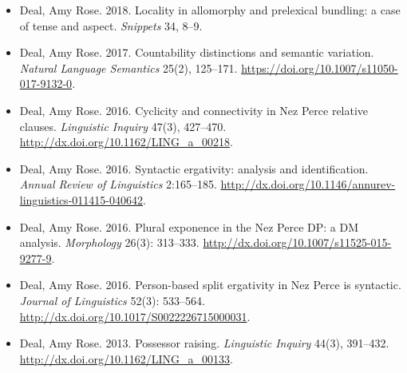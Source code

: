 \documentclass[12pt]{article}
\begin{document}
\begin{itemize}[labelsep=.5cm,leftmargin=0cm,itemindent=0cm]
    \item \new  Deal, Amy Rose. 2018. Locality in allomorphy and prelexical bundling: a case of tense and aspect. \emph{Snippets} 34, 8--9. 
    

  \item  Deal, Amy Rose. 2017. {Countability distinctions and semantic variation.}  \emph{Natural Language Semantics} 25(2), 125--171. \href{https://doi.org/10.1007/s11050-017-9132-0}{https://doi.org/10.1007/s11050-017-9132-0}.


  \item   Deal, Amy Rose. 2016. {Cyclicity and connectivity in Nez Perce relative clauses.} \emph{Linguistic Inquiry} 47(3),  427--470. \href{http://dx.doi.org/10.1162/LING_a_00218}{http://dx.doi.org/10.1162/LING\_a\_00218}.
 

  \item  Deal, Amy Rose. 2016. {Syntactic ergativity: analysis and identification.}  \emph{Annual Review of Linguistics} 2:165--185. \newline \href{http://dx.doi.org/10.1146/annurev-linguistics-011415-040642}{http://dx.doi.org/10.1146/annurev-linguistics-011415-040642}.
 
  \item  Deal, Amy Rose. 2016. {Plural exponence in the Nez Perce DP: a DM analysis.} \emph{Morphology} 26(3): 313--333. \href{http://dx.doi.org/10.1007/s11525-015-9277-9}{http://dx.doi.org/10.1007/s11525-015-9277-9}. 

 
   
  \item   Deal, Amy Rose. 2016. {Person-based split ergativity in Nez Perce is syntactic}.   \emph{Journal of Linguistics} 52(3): 533--564. \href{http://dx.doi.org/10.1017/S0022226715000031}{http://dx.doi.org/10.1017/S0022226715000031}.


 
  \item Deal, Amy Rose. 2013. {Possessor raising}. \emph{Linguistic Inquiry} 44(3), 391--432.   
\href{http://dx.doi.org/10.1162/LING_a_00133}{http://dx.doi.org/10.1162/LING\_a\_00133}.


\end{itemize}
\end{document}
